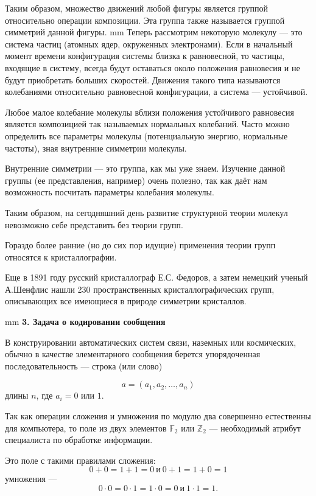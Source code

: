 \documentclass[12pt,english,russian]{article}
\begin{document}
	Таким образом, множество движений любой фигуры является
	группой относительно операции композиции. Эта группа также
	называется группой симметрий данной фигуры.
	 mm
	Теперь рассмотрим некоторую молекулу --- это система частиц
	(атомных ядер, окруженных электронами). Если в начальный момент 
	времени конфигурация системы близка к равновесной, то
	частицы, входящие в систему, всегда будут оставаться около положения 
	равновесия и не будут приобретать больших скоростей.
	Движения такого типа называются колебаниями относительно
	равновесной конфигурации, а система --- устойчивой.

	Любое малое колебание молекулы вблизи положения устойчивого 
	равновесия является композицией так называемых нормальных 
	колебаний. Часто можно определить все параметры молекулы 
	(потенциальную энергию, нормальные частоты), зная внутренние 
	симметрии молекулы.

	Внутренние симметрии --- это группа, как мы уже знаем. 
	Изучение данной группы (ее представления, например) очень полезно, 
	так как даёт нам возможность посчитать параметры колебания 
	молекулы.

	Таким образом, на сегодняшний день развитие структурной
	теории молекул невозможно себе представить без теории групп.

	Гораздо более ранние (но до сих пор идущие) применения теории 
	групп относятся к кристаллографии.

	Еще в 1891 году русский кристаллограф Е.С. Федоров, а затем
	немецкий ученый А.Шенфлис нашли 230 пространственных кристаллографических 
	групп, описывающих все имеющиеся в природе 
	симметрии кристаллов.

	 mm
	{\bf3. Задача о кодировании сообщения}

	В конструировании автоматических систем связи, наземных
	или космических, обычно в качестве элементарного сообщения
	берется упорядоченная последовательность --- строка (или слово)

	$$a = (a_1,a_2,\dots ,a_n)$$
	длины $n$, где $a_i = 0$ или $1$.

	Так как операции сложения и умножения по модулю два совершенно 
	естественны для компьютера, то поле из двух элементов
	$\mathbb F_2$ или $\mathbb Z_2$ --- необходимый атрибут специалиста по обработке информации.

	Это поле с такими правилами сложения:
	$$0 + 0 = 1 + 1 = 0 \ \text{и} \ 0 + 1 = 1 + 0 = 1$$
	умножения ---
	$$0\cdot 0 = 0\cdot 1 = 1\cdot 0 = 0 \ \text{и} \ 1\cdot 1 = 1.$$
\end{document}
